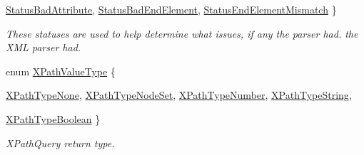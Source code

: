 \begin{DoxyCompactItemize}
\par
\hyperlink{namespaceMezzanine_1_1xml_a119489767bc2293563aef2066d960796ad2a8db4b09b737b361b035191fef3a60}{StatusBadAttribute}, 
\hyperlink{namespaceMezzanine_1_1xml_a119489767bc2293563aef2066d960796a2ef32e42a32922e4d6eb420528d5b291}{StatusBadEndElement}, 
\hyperlink{namespaceMezzanine_1_1xml_a119489767bc2293563aef2066d960796a7e82f0ab883c8712c91426b802fd6699}{StatusEndElementMismatch}
 \}
\begin{DoxyCompactList}\small\item\em These statuses are used to help determine what issues, if any the parser had. the XML parser had. \item\end{DoxyCompactList}\item 
enum \hyperlink{namespaceMezzanine_1_1xml_aca3f7ad3597c316e5ee6c216e126e7b0}{XPathValueType} \{ \par
\hyperlink{namespaceMezzanine_1_1xml_aca3f7ad3597c316e5ee6c216e126e7b0ac0e65173bc9ba7fbb14da6c14672adca}{XPathTypeNone}, 
\hyperlink{namespaceMezzanine_1_1xml_aca3f7ad3597c316e5ee6c216e126e7b0a4212e930cfc880a56d3f333e2e0ab1b3}{XPathTypeNodeSet}, 
\hyperlink{namespaceMezzanine_1_1xml_aca3f7ad3597c316e5ee6c216e126e7b0a24f2e6b0d3e5de11a1084cc9ceac38ac}{XPathTypeNumber}, 
\hyperlink{namespaceMezzanine_1_1xml_aca3f7ad3597c316e5ee6c216e126e7b0ab021af570c5d1fe4eab5f45a123785fc}{XPathTypeString}, 
\par
\hyperlink{namespaceMezzanine_1_1xml_aca3f7ad3597c316e5ee6c216e126e7b0a0c73a55cace18c4b552277d839c56c71}{XPathTypeBoolean}
 \}
\begin{DoxyCompactList}\small\item\em XPathQuery return type. \item\end{DoxyCompactList}\end{DoxyCompactItemize}
